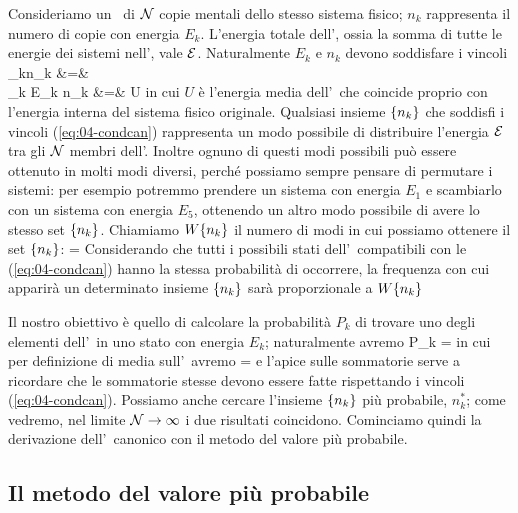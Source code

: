 Consideriamo un \ensemble\ di ${\mathcal N}$ copie mentali dello stesso sistema fisico; $n_k$ rappresenta il numero di copie con energia $E_k$. L'energia totale dell'\ensemble, ossia la somma di tutte le energie dei sistemi nell'\ensemble, vale ${\mathcal E}$. Naturalmente $E_k$ e $n_k$ devono soddisfare i vincoli
\bea
\label{eq:04-condcan}
\sum_{k}n_k      &=& \calN\nonumber\\
\sum_{k} E_k n_k &=& \calE \equiv U\calN
\eea
in cui $U$ è l'energia media dell'\ensemble\ che coincide proprio con l'energia interna del sistema fisico originale.
Qualsiasi insieme $\{n_k\}$ che soddisfi i vincoli (\ref{eq:04-condcan}) rappresenta un modo possibile di distribuire l'energia ${\mathcal E}$ tra gli ${\mathcal N}$ membri dell'\ensemble. Inoltre ognuno di questi modi possibili può essere ottenuto in molti modi diversi, perché possiamo sempre pensare di permutare i sistemi: per esempio potremmo prendere un sistema con energia $E_1$ e scambiarlo con un sistema con energia $E_5$, ottenendo un altro modo possibile di avere lo stesso set $\{n_k\}$. Chiamiamo $W\{n_k\}$ il numero di modi in cui possiamo ottenere il set $\{n_k\}$:
\be
\label{eq:04-W}
\Wnk = 
\ee
Considerando che tutti i possibili stati dell'\ensemble\ compatibili con le (\ref{eq:04-condcan}) hanno la stessa probabilità di occorrere, la frequenza con cui apparirà un determinato insieme
$\{n_k\}$ sarà proporzionale a $W\{n_k\}$

Il nostro obiettivo è quello di calcolare la probabilità $P_k$ di trovare uno degli elementi dell'\ensemble\ in uno stato con energia $E_k$; naturalmente avremo
\be
P_k = 
\ee
in cui per definizione di media sull'\ensemble\ avremo
\be
\label{eq:04-nrmean}
 = 
\ee
e l'apice sulle sommatorie serve a ricordare che le sommatorie stesse devono essere fatte rispettando i vincoli (\ref{eq:04-condcan}). Possiamo anche cercare l'insieme $\{n_k\}$ più probabile, $n_k^*$; come vedremo, nel limite ${\mathcal N}\to\infty$ i due risultati coincidono. Cominciamo quindi la derivazione dell'\ensemble\ canonico con il metodo del valore più probabile.

\subsection{Il metodo del valore più probabile}

